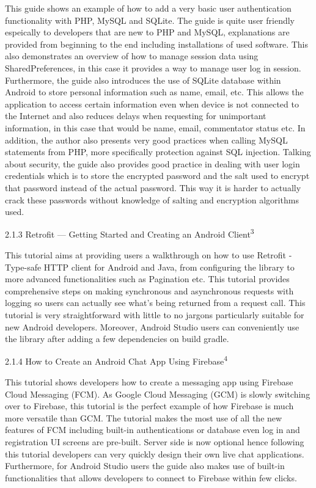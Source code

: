 \documentclass{article}
\begin{document}
\begin{flushleft}
This guide shows an example of how to add a very basic user authentication functionality with PHP, MySQL and SQLite. The guide is quite user friendly espeically to developers that are new to PHP and MySQL, explanations are provided from beginning to the end including installations of used software. This also demonstrates an overview of how to manage session data using SharedPreferences, in this case it provides a way to manage user log in session. Furthermore, the guide also introduces the use of SQLite database within Android to store personal information such as name, email, etc. This allows the application to access certain information even when device is not connected to the Internet and also reduces delays when requesting for unimportant information, in this case that would be name, email, commentator status etc. In addition, the author also presents very good practices when calling MySQL statements from PHP, more specifically protection against SQL injection. Talking about security, the guide also provides good practice in dealing with user login credentials which is to store the encrypted password and the salt used to encrypt that password instead of the actual password. This way it is harder to actually crack these passwords without knowledge of salting and encryption algorithms used.\par
{\large 2.1.3 Retrofit — Getting Started and Creating an Android Client\textsuperscript{3}}\par
This tutorial aims at providing users a walkthrough on how to use Retrofit - Type-safe HTTP client for Android and Java, from configuring the library to more advanced functionalities such as Pagination etc. This tutorial provides comprehensive steps on making synchronous and asynchronous requests with logging so users can actually see what's being returned from a request call. This tutorial is very straightforward with little to no jargons particularly suitable for new Android developers. Moreover, Android Studio users can conveniently use the library after adding a few dependencies on build gradle. \par
{\large 2.1.4 How to Create an Android Chat App Using Firebase\textsuperscript{4}}\par
This tutorial shows developers how to create a messaging app using Firebase Cloud Messaging (FCM). As Google Cloud Messaging (GCM) is slowly switching over to Firebase, this tutorial is the perfect example of how Firebase is much more versatile than GCM. The tutorial makes the most use of all the new features of FCM including built-in authentications or database even log in and registration UI screens are pre-built. Server side is now optional hence following this tutorial developers can very quickly design their own live chat applications. Furthermore, for Android Studio users the guide also makes use of built-in functionalities that allows developers to connect to Firebase within few clicks.\par

\end{flushleft}
\end{document}
